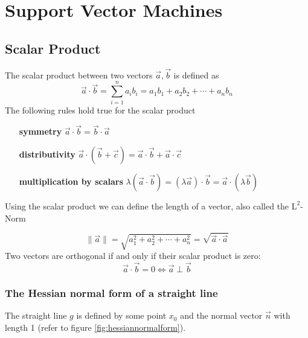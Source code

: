 \documentclass[a4paper, 11pt]{article}
\begin{document}
\section{Support Vector Machines}

\subsection{Scalar Product}
The scalar product between two vectors $\vec{a}, \vec{b}$ is defined as
\begin{equation}
	\vec{a}\cdot\vec{b}=\sum_{i=1}^{n}a_i b_i = a_1 b_1 + a_2 b_2 + \cdots + a_n b_n
\end{equation}
\noindent
The following rules hold true for the scalar product

\begin{itemize}[leftmargin=*, labelindent=5cm, labelsep=0.5cm]
	\item[\textbf{symmetry}] $\vec{a}\cdot\vec{b} = \vec{b}\cdot\vec{a}$
	\item[\textbf{distributivity}] $\vec{a}\cdot(\vec{b}+\vec{c}) = \vec{a}\cdot\vec{b} + \vec{a}\cdot\vec{c} $
	\item[\textbf{multiplication by scalars}] $\lambda(\vec{a}\cdot\vec{b}) = (\lambda\vec{a})\cdot\vec{b} = \vec{a}\cdot(\lambda\vec{b})$
\end{itemize}
\noindent
Using the scalar product we can define the length of a vector, also called the $\text{L}^2$-Norm

\begin{equation}
	\| \vec{a} \| = \sqrt{a_1^2 + a_2^2 + \cdots + a_n^2} = \sqrt{\vec{a}\cdot\vec{a}}
\end{equation}
\noindent
Two vectors are orthogonal if and only if their scalar product is zero:
\begin{equation}
	\vec{a}\cdot\vec{b} = 0 \Leftrightarrow \vec{a} \perp \vec{b}
\end{equation}

\subsubsection{The Hessian normal form of a straight line}

The straight line $g$ is defined by some point $x_0$ and the normal vector $\vec{n}$ with length 1 (refer to figure \ref{fig:hessiannormalform}).
\end{document}
